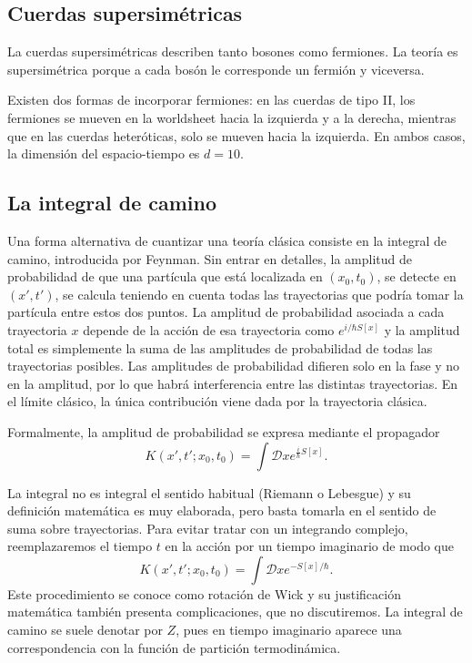 \subsection{Cuerdas supersimétricas}

La cuerdas supersimétricas describen tanto bosones como fermiones.
La teoría es supersimétrica porque a cada bosón le corresponde un fermión y viceversa.

Existen dos formas de incorporar fermiones:
en las cuerdas de tipo II, los fermiones se mueven en la worldsheet hacia la izquierda y a la derecha,
mientras que en las cuerdas heteróticas, solo se mueven hacia la izquierda.
En ambos casos, la dimensión del espacio-tiempo es $d=10$.


\subsection{La integral de camino}

Una forma alternativa de cuantizar una teoría clásica consiste en la integral de camino, 
introducida por Feynman. 
Sin entrar en detalles, la amplitud de probabilidad de que una partícula que está localizada 
en $(x_0,t_0)$, se detecte en $(x',t')$, se calcula teniendo en cuenta todas las trayectorias
que podría tomar la partícula entre estos dos puntos.
La amplitud de probabilidad asociada a cada trayectoria $x$ depende de la acción de esa trayectoria
como $e^{i/\hbar S[x]}$ y la amplitud total es simplemente la suma de las amplitudes de probabilidad
de todas las trayectorias posibles.
Las amplitudes de probabilidad difieren solo en la fase y no en la amplitud, por lo que habrá 
interferencia entre las distintas trayectorias.
En el límite clásico, la única contribución viene dada por la trayectoria clásica.

Formalmente, la amplitud de probabilidad se expresa mediante el propagador
\begin{equation}
  K(x',t';x_0,t_0) = \int \mathcal Dx e^{\frac{i}{\hbar} S[x]}.
\end{equation}

La integral no es integral el sentido habitual (Riemann o Lebesgue) y su definición matemática
es muy elaborada, pero basta tomarla en el sentido de suma sobre trayectorias.
Para evitar tratar con un integrando complejo, reemplazaremos el tiempo $t$ en la acción por un tiempo imaginario de modo que
\begin{equation}
  K(x',t';x_0,t_0) = \int \mathcal Dx e^{- S[x]/ \hbar}.
\end{equation}
Este procedimiento se conoce como rotación de Wick y su justificación matemática también presenta complicaciones, 
que no discutiremos.
La integral de camino se suele denotar por $Z$, pues en tiempo imaginario aparece una correspondencia
con la función de partición termodinámica.

